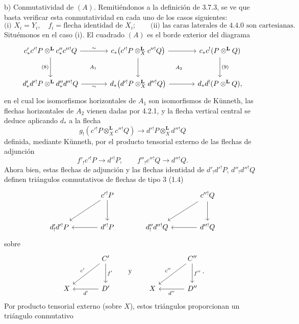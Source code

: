 \begin{prooftext}[Demostración]
b) Conmutatividad de $(A)$. Remitiéndonos a la definición de 3.7.3, se ve que basta verificar esta conmutatividad en cada uno de los casos siguientes:
\[
\text{(i) } X_i=Y_i,\quad f_i=\text{flecha identidad de }X_i;\qquad
\text{(ii) las caras laterales de 4.4.0 son cartesianas.}
\]
Situémonos en el caso (i). El cuadrado $(A)$ es el borde exterior del diagrama
\[
\begin{tikzcd}[column sep=large,row sep=large]
c'_*c'{}^!P\otimes^{\mathbf L}c''_*c''{}^!Q
 \arrow[r,"\sim"] \arrow[d,"(8)"'] &
c_*\bigl(c'{}^!P\otimes_X^{\mathbf L}c''{}^!Q\bigr)
 \arrow[r] \arrow[d] &
c_*c^!(P\otimes^{\mathbf L} Q)\arrow[d,"(9)"]\\
d'_*d'{}^!P\otimes^{\mathbf L}d''_*d''{}^!Q
 \arrow[r,"\sim"'] &
d_*\bigl(d'{}^!P\otimes_X^{\mathbf L}d''{}^!Q\bigr)
 \arrow[r] &
d_*d^!(P\otimes^{\mathbf L} Q),
\arrow[from=1-1,to=2-2, phantom, "\scriptstyle A_1"]
\arrow[from=1-2,to=2-3, phantom, "\scriptstyle A_2"]
\end{tikzcd}
\]
en el cual los isomorfismos horizontales de $A_1$ son isomorfismos de Künneth, las flechas horizontales de $A_2$ vienen dadas por 4.2.1, y la flecha vertical central se deduce aplicando $d_*$ a la flecha
\[
g_!(c'{}^!P\otimes_X^{\mathbf L}c''{}^!Q)\longrightarrow d'{}^!P\otimes_X^{\mathbf L}d''{}^!Q
\]
definida, mediante Künneth, por el producto tensorial externo de las flechas de adjunción
\[
f'_!c'{}^!P\longrightarrow d'{}^!P,\qquad
f''_!c''{}^!Q\longrightarrow d''{}^!Q.
\]
Ahora bien, estas flechas de adjunción y las flechas identidad de $d'_!d'{}^!P$, $d''_!d''{}^!Q$ definen triángulos conmutativos de flechas de tipo $3$ (1.4)
\[
\begin{tikzcd}[column sep=large,row sep=large]
& c'{}^!P \arrow[d] \arrow[dl] & & c''{}^!Q \arrow[d]\arrow[dl]\\
d'_!d'{}^!P & d'{}^!P\arrow[l] & d''_!d''{}^!Q & d''{}^!Q\arrow[l]
\end{tikzcd}
\]
sobre
\[
\begin{tikzcd}[column sep=large,row sep=large]
& C' \arrow[d,"f'"] \arrow[dl,"c'"']\\
X & D'\arrow[l,"d'"]
\end{tikzcd}
\qquad\text{y}\qquad
\begin{tikzcd}[column sep=large,row sep=large]
& C'' \arrow[d,"f''"] \arrow[dl,"c''"']\\
X & D''\arrow[l,"d''"]
\end{tikzcd}.
\]
Por producto tensorial externo (sobre $X$), estos triángulos proporcionan un triángulo conmutativo
\[
\begin{tikzcd}[column sep=huge,row sep=large]

\end{tikzcd}\]
\end{prooftext}
